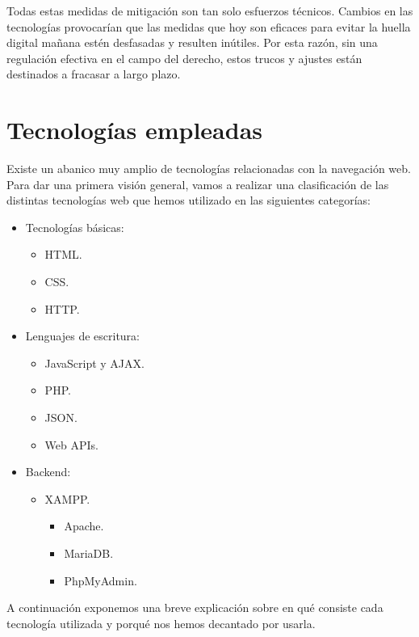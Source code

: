 Todas estas medidas de mitigación son tan solo esfuerzos técnicos. Cambios en las tecnologías provocarían que las medidas que hoy son eficaces para evitar la huella digital mañana estén desfasadas y resulten inútiles. Por esta razón, sin una regulación efectiva en el campo del derecho, estos trucos y ajustes están destinados a fracasar a largo plazo.  \par 

\section{Tecnologías empleadas}

Existe un abanico muy amplio de tecnologías\cite{web_mozilla} relacionadas con la navegación web. Para dar una primera visión general, vamos a realizar una clasificación de las distintas tecnologías web que hemos utilizado en las siguientes categorías: \par
\begin{itemize}
	\item Tecnologías básicas:
		\begin{itemize}
			\item HTML.
			\item CSS.
			\item HTTP.
		\end{itemize}
	\item Lenguajes de escritura:
		\begin{itemize}
			\item JavaScript y AJAX.
			\item PHP.
			\item JSON.
			\item Web APIs.
		\end{itemize}
	\item Backend:
		\begin{itemize}
			\item XAMPP.
				\begin{itemize}
					\item Apache.
					\item MariaDB.
					\item PhpMyAdmin.
				\end{itemize}
		\end{itemize}
\end{itemize}

A continuación exponemos una breve explicación sobre en qué consiste cada tecnología utilizada y porqué nos hemos decantado por usarla. \par 

